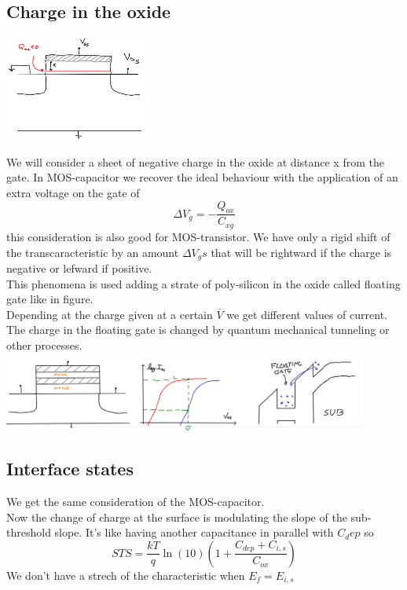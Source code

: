 \subsection{Charge in the oxide}

\centering
\includegraphics[width=0.35\textwidth]{qox.png}\\
\raggedright

We will consider a sheet of negative charge in the oxide at distance x from the gate. In MOS-capacitor we recover the ideal behaviour with the application of an extra voltage on the gate of 
\begin{equation}
\Delta V_g=-\frac{Q_{ox}}{C_{xg}}
\end{equation}
this consideration is also good for MOS-transistor. We have only a rigid shift of the transcaracteristic by an amount $\Delta V_gs$ that will be rightward if the charge is negative or lefward if positive.\\
This phenomena is used adding a strate of poly-silicon in the oxide called floating gate like in figure.\\
Depending at the charge given at a certain $\overline{V}$ we get different values of current. The charge in the floating gate is changed by quantum mechanical tunneling or other processes.\\

\centering
\includegraphics[width=0.9\textwidth]{flatinggate.png}\\
\raggedright

\subsection{Interface states}
We get the same consideration of the MOS-capacitor.\\
Now the change of charge at the surface is modulating the slope of the sub-threshold slope. It's like having another capacitance in parallel with $C_dep$ so
\begin{equation}
STS=\frac{kT}{q}\ln(10)\left(1+\frac{C_{dep}+C_{i,s}}{C_{ox}}\right)
\end{equation}
We don't have a strech of the characteristic when $E_f=E_{i,s}$

